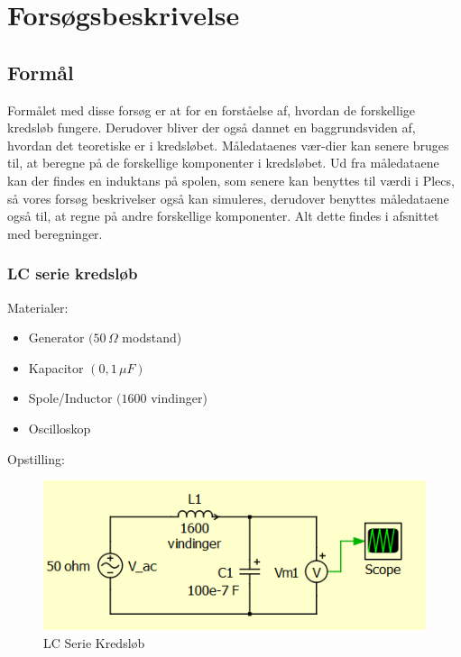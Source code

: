 \section{Forsøgsbeskrivelse}

\subsection{Formål}
Formålet med disse forsøg er at for en forståelse af, hvordan de forskellige kredsløb fungere. Derudover bliver der også dannet en baggrundsviden af, hvordan det teoretiske er i kredsløbet. Måledataenes vær-dier kan senere bruges til, at beregne på de forskellige komponenter i kredsløbet. Ud fra måledataene kan der findes en induktans på spolen, som senere kan benyttes til værdi i Plecs, så vores forsøg beskrivelser også kan simuleres, derudover benyttes måledataene også til, at regne på andre forskellige komponenter. Alt dette findes i afsnittet med beregninger.

\subsubsection{LC serie kredsløb}

Materialer:

\begin{itemize}
\item Generator $(50\, \Omega$ modstand)
\item Kapacitor $( 0,1\, \mu F)$
\item Spole/Inductor $(1600$ vindinger)
\item Oscilloskop
\end{itemize}

Opstilling:

\begin{figure}[H]
\centering
\includegraphics[scale=1]{Vildledning/Schematics/Kredslb/LC_Serie}
\caption{LC Serie Kredsløb}
\label{lcserie}
\end{figure}

